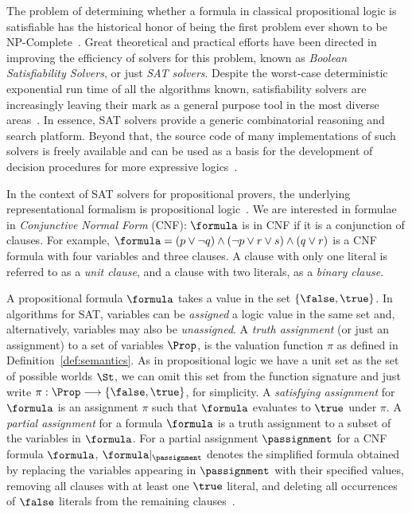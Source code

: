The problem of determining whether a formula in classical propositional logic is
satisfiable has the historical honor of being the first problem ever shown to be
NP-Complete~\cite{Cook}. Great theoretical and practical efforts have been
directed in improving the efficiency of solvers for this problem, known as
\emph{Boolean Satisfiability Solvers}, or just \emph{SAT solvers}. Despite the
worst-case deterministic exponential run time of all the algorithms known,
satisfiability solvers are increasingly leaving their mark as a general purpose
tool in the most diverse areas~\cite{satchapter}. In essence, SAT solvers
provide a generic combinatorial reasoning and search platform. Beyond that, the
source code of many implementations of such solvers is freely available and can
be used as a basis for the development of decision procedures for more
expressive logics~\cite{giunchiglia2002sat}.

In the context of SAT solvers for propositional provers, the underlying
representational formalism is propositional logic~\cite{satchapter}. We are
interested in formulae in \emph{Conjunctive Normal Form} (CNF): $\formula$ is in
CNF if it is a conjunction of clauses. For example, $\formula = (p \lor \neg q)
\land (\neg p \lor r \lor s) \land (q \lor r)$ is a CNF formula with four
variables and three clauses. A clause with only one literal is referred to as a
\emph{unit clause}, and a clause with two literals, as a \emph{binary clause}.

A propositional formula $\formula$ takes a value in the set $\{\false, \true\}$. In
algorithms for SAT, variables can be \emph{assigned} a logic value in the same
set and, alternatively, variables may also be \emph{unassigned}. A \emph{truth
assignment} (or just an assignment) to a set of variables $\Prop$, is the valuation
function $\pi$ as defined in Definition~\ref{def:semantics}. As in propositional
logic we have a unit set as the set of possible worlds $\St$, we can omit this
set from the function signature and just write $\pi : \Prop \longrightarrow
\{\false,\true\}$, for simplicity. A \emph{satisfying assignment} for $\formula$
is an assignment $\pi$ such that $\formula$ evaluates to $\true$ under $\pi$.  A
\emph{partial assignment} for a formula $\formula$ is a truth assignment to a
subset of the variables in $\formula$. For a partial assignment $\passignment$
for a CNF formula $\formula$, $\formula|_\passignment$ denotes the simplified
formula obtained by replacing the variables appearing in $\passignment$ with
their specified values, removing all clauses with at least one $\true$ literal,
and deleting all occurrences of $\false$ literals from the remaining
clauses~\cite{satchapter}.   

